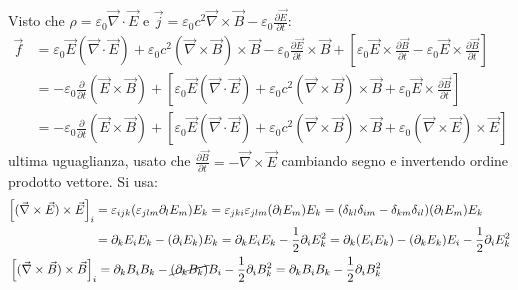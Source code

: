 \documentclass[a4paper]{scrartcl}
\numberwithin{equation}{subsection}
\theoremstyle{style1}
\begin{document}
Visto che $\rho  = \varepsilon _0 \vec{\nabla }\cdot \vec{E}$ e $\vec{j}=\varepsilon _0 c^2 \vec{\nabla }\times \vec{B}-\varepsilon_0 \frac{\partial \vec{E}}{\partial t} $:
\begin{equation*}
	\begin{split}
		\vec{f}&=\varepsilon _0 \vec{E}(\vec{\nabla }\cdot \vec{E}) + \varepsilon _0 c^2 (\vec{\nabla }\times \vec{B}) \times \vec{B} - \varepsilon _0 \frac{\partial  \vec{E}}{\partial  t} \times \vec{B} + \left[ \varepsilon _0 \vec{E}\times \frac{\partial \vec{B}}{\partial t} - \varepsilon _0\vec{E}\times \frac{\partial \vec{B}}{\partial t}  \right] \\
		       &=-\varepsilon _0 \frac{\partial }{\partial t} (\vec{E}\times \vec{B}) + \left[ \varepsilon _0 \vec{E}(\vec{\nabla }\cdot \vec{E}) +\varepsilon _0 c^2 (\vec{\nabla }\times \vec{B})\times \vec{B} + \varepsilon _0 \vec{E}\times \frac{\partial \vec{B}}{\partial t}  \right] \\
		       &=-\varepsilon _0 \frac{\partial }{\partial t} (\vec{E}\times \vec{B}) + \left[ \varepsilon _0 \vec{E}(\vec{\nabla }\cdot \vec{E}) +\varepsilon _0 c^2 (\vec{\nabla }\times \vec{B})\times \vec{B} + \varepsilon _0 (\vec{\nabla }\times \vec{E})\times \vec{E}  \right] 
	\end{split}
\end{equation*}
ultima uguaglianza, usato che $\frac{\partial \vec{B}}{\partial t} = - \vec{\nabla }\times \vec{E}$ cambiando segno e invertendo ordine prodotto vettore.
Si usa:
\begin{equation*}
	\begin{split}
		&\begin{split}
			\left[ (\vec{\nabla }\times \vec{E})\times \vec{E} \right] _i &= \varepsilon _{ijk} (\varepsilon _{jlm} \partial _l E_m) E_k = \varepsilon _{jki} \varepsilon _{jlm} (\partial _l E_m) E_k = (\delta _{kl} \delta _{im} -\delta _{km} \delta _{il} ) (\partial _{l} E_m) E_k\\
										      &=\partial _k E_i E_k - (\partial _i E_k) E_k = \partial _k E_i E_k - \frac{1}{2}\partial _i E_k^2=\partial _k(E_iE_k) - (\partial _k E_k) E_i - \frac{1}{2}\partial _i E_k^2
		\end{split}\\
		& \left[ (\vec{\nabla }\times \vec{B}) \times \vec{B} \right] _i = \partial _k B_i B_k - \cancel{(\partial _k B_k )} B_i - \frac{1}{2}\partial _i B_k^2=\partial _k B_i B_k - \frac{1}{2}\partial _i B_k^2
	\end{split}
\end{equation*}
\end{document}
